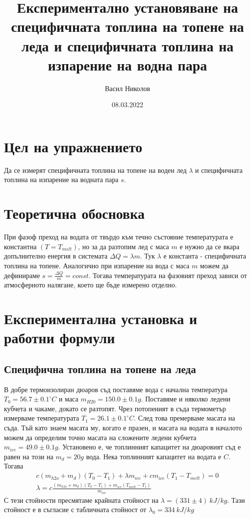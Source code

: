 \documentclass[%
 reprint,
 amsmath,amssymb,
 aps,
]{revtex4-2}
\begin{document}

\title{Експериментално установяване на специфичната топлина на топене на леда и специфичната топлина на изпарение на водна пара}
\author{Васил Николов}
\date{08.03.2022}
\maketitle

\section{Цел на упражнението}
Да се измерят специфичната топлина на топене на воден лед $\lambda$ и специфичната топлина на изпарение на водната пара $s$. 

\section{Теоретична обосновка}

При фазоф преход на водата от твърдо към течно състояние температурата е константна $(T = T_{melt})$, но за да разтопим лед с маса $m$ е нужно да се вкара допълнително енергия в системата $\Delta Q = \lambda m$. Тук $\lambda$ е константа - специфичната топлина на топене. Аналогично при изпарение на вода с маса $m$ можем да дефинираме $s = \frac{\Delta Q}{m} = const$. Тогава температурата на фазовият преход зависи от атмосферното налягане, което ще бъде измерено отделно. 

\section{Експериментална установка и работни формули}

\subsection{Специфична топлина на топене на леда}
В добре термоизолиран дюаров съд поставяме вода с начална температура $T_0 = 56.7 \pm 0.1 ^{\circ}C $ и маса $m_{H20} = 150.0 \pm 0.1 g$. Поставяме и няколко ледени кубчета и чакаме, докато се разтопят. Чрез потопеният в съда термометър измерваме температурата $T_1 = 26.1 \pm 0.1 ^{\circ}C $. След това премерваме масата на съда. Тъй като знаем масата му, когато е празен, и масата на водата в началото можем да определим точно масата на сложените ледени кубчета $m_{ice} = 49.0 \pm 0.1 g$. Установено е, че топлинният капацитет на дюаровият съд е равен на този на $m_d = 20g$ вода. Нека топлинният капацитет на водата е $C$. Тогава
\begin{gather*}
    c(m_{h2o} + m_d)(T_0 - T_1) + \lambda m_{ice} + c m_{ice} (T_1 - T_{melt}) = 0 \\
    \lambda = c \frac{(m_{h2o} + m_d)(T_0 - T_1) + m_{ice}(T_{melt} - T_1)}{m_{ice}}
\end{gather*}
С тези стойности пресмятаме крайната стойност на $\lambda = (331 \pm 4) \ kJ/kg$. Тази стойност е в съгласие с табличната стойност от $\lambda_0 = 334 \ kJ/kg$
\end{document}
